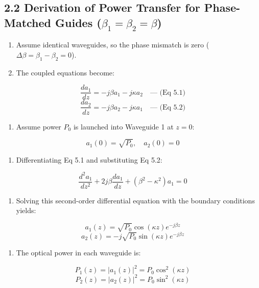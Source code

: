 \subsection{2.2 Derivation of Power Transfer for Phase-Matched Guides ($\beta_1 = \beta_2 = \beta$)}
\begin{enumerate}
  \item Assume identical waveguides, so the phase mismatch is zero ($\Delta\beta = \beta_1 - \beta_2 = 0$).
  \item The coupled equations become:
\end{enumerate}
    \[ \frac{da_1}{dz} = -j\beta a_1 - j\kappa a_2 \quad \text{--- (Eq 5.1)} \]
    \[ \frac{da_2}{dz} = -j\beta a_2 - j\kappa a_1 \quad \text{--- (Eq 5.2)} \]
\begin{enumerate}
  \item Assume power $P_0$ is launched into Waveguide 1 at $z=0$:
\end{enumerate}
    \[ a_1(0) = \sqrt{P_0}, \quad a_2(0) = 0 \]
\begin{enumerate}
  \item Differentiating Eq 5.1 and substituting Eq 5.2:
\end{enumerate}
    \[ \frac{d^2a_1}{dz^2} + 2j\beta \frac{da_1}{dz} + (\beta^2 - \kappa^2) a_1 = 0 \]
\begin{enumerate}
  \item Solving this second-order differential equation with the boundary conditions yields:
\end{enumerate}
    \[ a_1(z) = \sqrt{P_0} \cos(\kappa z) e^{-j\beta z} \]
    \[ a_2(z) = -j \sqrt{P_0} \sin(\kappa z) e^{-j\beta z} \]
\begin{enumerate}
  \item The optical power in each waveguide is:
\end{enumerate}
    \[ P_1(z) = |a_1(z)|^2 = P_0 \cos^2(\kappa z) \]
    \[ P_2(z) = |a_2(z)|^2 = P_0 \sin^2(\kappa z) \]



